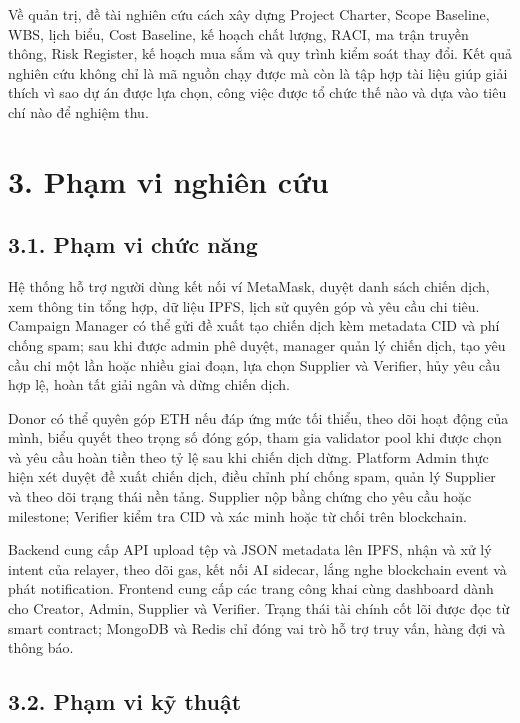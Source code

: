 Về quản trị, đề tài nghiên cứu cách xây dựng Project Charter, Scope Baseline, WBS, lịch biểu, Cost Baseline, kế hoạch chất lượng, RACI, ma trận truyền thông, Risk Register, kế hoạch mua sắm và quy trình kiểm soát thay đổi. Kết quả nghiên cứu không chỉ là mã nguồn chạy được mà còn là tập hợp tài liệu giúp giải thích vì sao dự án được lựa chọn, công việc được tổ chức thế nào và dựa vào tiêu chí nào để nghiệm thu.

\section*{3. Phạm vi nghiên cứu}

\subsection*{3.1. Phạm vi chức năng}

Hệ thống hỗ trợ người dùng kết nối ví MetaMask, duyệt danh sách chiến dịch, xem thông tin tổng hợp, dữ liệu IPFS, lịch sử quyên góp và yêu cầu chi tiêu. Campaign Manager có thể gửi đề xuất tạo chiến dịch kèm metadata CID và phí chống spam; sau khi được admin phê duyệt, manager quản lý chiến dịch, tạo yêu cầu chi một lần hoặc nhiều giai đoạn, lựa chọn Supplier và Verifier, hủy yêu cầu hợp lệ, hoàn tất giải ngân và dừng chiến dịch.

Donor có thể quyên góp ETH nếu đáp ứng mức tối thiểu, theo dõi hoạt động của mình, biểu quyết theo trọng số đóng góp, tham gia validator pool khi được chọn và yêu cầu hoàn tiền theo tỷ lệ sau khi chiến dịch dừng. Platform Admin thực hiện xét duyệt đề xuất chiến dịch, điều chỉnh phí chống spam, quản lý Supplier và theo dõi trạng thái nền tảng. Supplier nộp bằng chứng cho yêu cầu hoặc milestone; Verifier kiểm tra CID và xác minh hoặc từ chối trên blockchain.

Backend cung cấp API upload tệp và JSON metadata lên IPFS, nhận và xử lý intent của relayer, theo dõi gas, kết nối AI sidecar, lắng nghe blockchain event và phát notification. Frontend cung cấp các trang công khai cùng dashboard dành cho Creator, Admin, Supplier và Verifier. Trạng thái tài chính cốt lõi được đọc từ smart contract; MongoDB và Redis chỉ đóng vai trò hỗ trợ truy vấn, hàng đợi và thông báo.

\subsection*{3.2. Phạm vi kỹ thuật}

